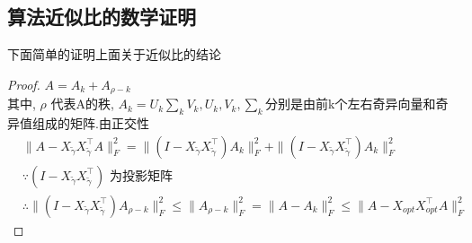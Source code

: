\documentclass{ctexart}
\begin{document}
    \subsection{算法近似比的数学证明}
    下面简单的证明上面关于近似比的结论
    \begin{proof}
    $  A = A_{k} + A_{\rho - k} $\\
    其中, $ \rho $ 代表A的秩, $A_{k} = U_{k}\sum_{k}V_{k}, U_{k},V_{k},\sum_{k}$分别是由前k个左右奇异向量和奇异值组成的矩阵.由正交性
    \begin{align*}
    &\| A - X_{\tilde{\gamma}}X_{\tilde{\gamma}}^{\top}A \|_{F}^2 =
     \| (I - X_{\tilde{\gamma}}X_{\tilde{\gamma}}^{\top})A_{k} \|_{F}^2
    + \| (I - X_{\tilde{\gamma}}X_{\tilde{\gamma}}^{\top}) A_{k} \|_{F}^2\\
    &\because
    (I - X_{\tilde{\gamma}}X_{\tilde{\gamma}}^{\top}) \text { 为投影矩阵 }\\
    & \therefore
    \|(I - X_{\tilde{\gamma}}X_{\tilde{\gamma}}^{\top})A_{\rho -k}\|_{F}^2
        \le \|A_{\rho - k}\|_{F}^2 = \|A - A_{k} \|_{F}^2 	
        \le \|A - X_{opt}X_{opt}^{\top}A\|_{F}^2
    \end{align*}


\end{proof}
\end{document}
